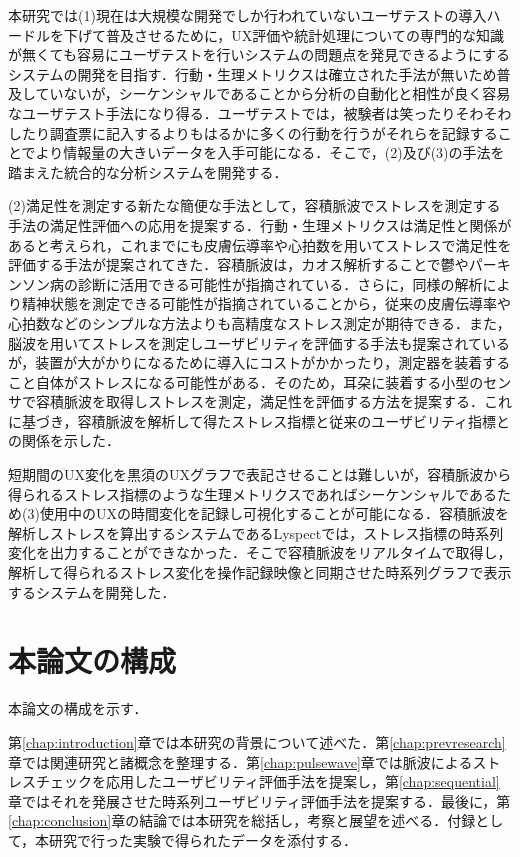 本研究では(1)現在は大規模な開発でしか行われていないユーザテストの導入ハードルを下げて普及させるために，UX評価や統計処理についての専門的な知識が無くても容易にユーザテストを行いシステムの問題点を発見できるようにするシステムの開発を目指す．行動・生理メトリクスは確立された手法が無いため普及していないが，シーケンシャルであることから分析の自動化と相性が良く容易なユーザテスト手法になり得る．ユーザテストでは，被験者は笑ったりそわそわしたり調査票に記入するよりもはるかに多くの行動を行うがそれらを記録することでより情報量の大きいデータを入手可能になる\cite{tullis2014}．そこで，(2)及び(3)の手法を踏まえた統合的な分析システムを開発する．

(2)満足性を測定する新たな簡便な手法として，容積脈波でストレスを測定する手法の満足性評価への応用を提案する．行動・生理メトリクスは満足性と関係があると考えられ\cite{tullis2014}，これまでにも皮膚伝導率や心拍数を用いてストレスで満足性を評価する手法が提案されてきた．容積脈波は，カオス解析することで鬱やパーキンソン病の診断に活用できる可能性が指摘されている\cite{tuan}\cite{oyama}．さらに，同様の解析により精神状態を測定できる可能性\cite{arai}が指摘されていることから，従来の皮膚伝導率や心拍数などのシンプルな方法よりも高精度なストレス測定が期待できる．また，脳波を用いてストレスを測定しユーザビリティを評価する手法\cite{amaral}も提案されているが，装置が大がかりになるために導入にコストがかかったり，測定器を装着すること自体がストレスになる可能性がある．そのため，耳朶に装着する小型のセンサで容積脈波を取得しストレスを測定，満足性を評価する方法を提案する．これに基づき，容積脈波を解析して得たストレス指標と従来のユーザビリティ指標との関係を示した．

短期間のUX変化を黒須のUXグラフで表記させることは難しいが，容積脈波から得られるストレス指標のような生理メトリクスであればシーケンシャルであるため(3)使用中のUXの時間変化を記録し可視化することが可能になる．容積脈波を解析しストレスを算出するシステムであるLyspect\cite{oyama2012}では，ストレス指標の時系列変化を出力することができなかった．そこで容積脈波をリアルタイムで取得し，解析して得られるストレス変化を操作記録映像と同期させた時系列グラフで表示するシステムを開発した．

\section{本論文の構成}

本論文の構成を示す．

第\ref{chap:introduction}章では本研究の背景について述べた．第\ref{chap:prevresearch}章では関連研究と諸概念を整理する．第\ref{chap:pulsewave}章では脈波によるストレスチェックを応用したユーザビリティ評価手法を提案し，第\ref{chap:sequential}章ではそれを発展させた時系列ユーザビリティ評価手法を提案する．最後に，第\ref{chap:conclusion}章の結論では本研究を総括し，考察と展望を述べる．付録として，本研究で行った実験で得られたデータを添付する．
